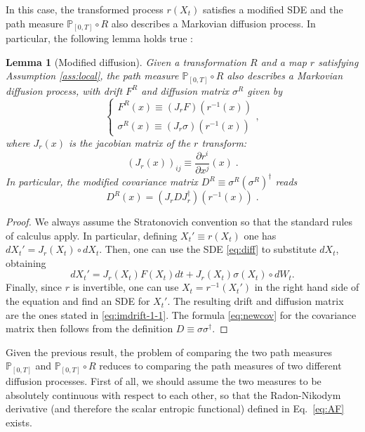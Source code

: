 \documentclass[a4paper,11pt]{article}
\numberwithin{equation}{section}
\newtheorem{lemma}[theorem]{Lemma}
\begin{document}
In this case, the transformed process $r(X_t)$ satisfies a modified SDE and the path measure $\mathbb{P}_{\left[0,T\right]}\circ R$ also describes a Markovian diffusion process. In particular, the following lemma holds true \cite{CT25+}: 
\begin{lemma}[Modified diffusion]  
 Given a transformation $R$ and a map $r$ satisfying Assumption \ref{ass:local}, the path measure $\mathbb{P}_{\left[0,T\right]}\circ R$ also describes a Markovian diffusion process, with drift $F^{R}$ and diffusion matrix $\sigma^{R}$ given by
\begin{equation}\label{eq:imdrift-1-1}
\begin{cases}
 F^{R}(x)\equiv\left(J_{r}F\right)\left(r^{-1}\left(x\right)\right)\\
 \sigma^{R}(x) \equiv \left(J_{r}\sigma\right)\left(r^{-1}\left(x\right)\right)
\end{cases},
\end{equation}
where $J_{r}(x)$ is the jacobian matrix of the $r$ transform: 
\begin{equation}\label{eq:Jac-2}
\left(J_{r}(x)\right)_{ij}\equiv\frac{\partial r^{i}}{\partial x^{j}}(x) \;. 
\end{equation}
In particular, the modified covariance matrix $D^{R} \equiv \sigma^{R}(\sigma^{R})^\dag$ reads
\begin{equation}\label{eq:newcov}
    D^{R}(x) =\left(J_{r} D J_{r}^{\dag}\right)\left(r^{-1}\left(x\right)\right)  \;.
\end{equation}
\end{lemma}
\begin{proof}
    We always assume the Stratonovich convention so that the standard rules of calculus apply. In particular, defining $X_t' \equiv r(X_t)$ one has $d X_t'= J_r(X_t) \circ d X_t$. Then, one can use the SDE \eqref{eq:diff} to substitute $d X_t$, obtaining
    \begin{equation*}
        d X_t'= J_r(X_t) F(X_t) dt +  J_r(X_t) \sigma(X_{t})\circ dW_t.
    \end{equation*}
    Finally, since $r$ is invertible, one can use $X_t= r^{-1}(X_t')$ in the right hand side of the equation and find an SDE for $X_t'$. The resulting drift and diffusion matrix are the ones stated in \eqref{eq:imdrift-1-1}. The formula \eqref{eq:newcov} for the covariance matrix then follows from the definition $D \equiv \sigma \sigma^\dag$.
\end{proof}
Given the previous result, the problem of comparing the two path measures $\mathbb{P}_{\left[0,T\right]}$ and $\mathbb{P}_{\left[0,T\right]}\circ R$ reduces to comparing the path measures of two different diffusion processes. First of all, we should assume the two measures to be absolutely continuous with respect to each other, so that the Radon-Nikodym derivative (and therefore the scalar entropic functional) defined in Eq.~\eqref{eq:AF} exists.
\end{document}
